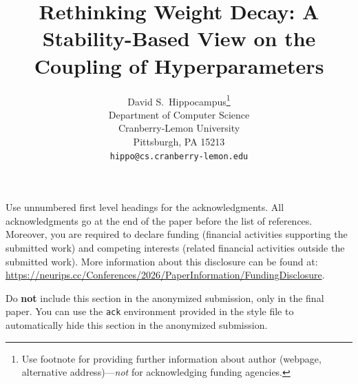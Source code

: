 \documentclass{article}
\title{Rethinking Weight Decay: A Stability-Based View on the Coupling of Hyperparameters}
\author{%
  David S.~Hippocampus\thanks{Use footnote for providing further information
    about author (webpage, alternative address)---\emph{not} for acknowledging
    funding agencies.} \\
  Department of Computer Science\\
  Cranberry-Lemon University\\
  Pittsburgh, PA 15213 \\
  \texttt{hippo@cs.cranberry-lemon.edu} \\
}
\begin{document}
\maketitle




















\begin{ack}
Use unnumbered first level headings for the acknowledgments. All acknowledgments
go at the end of the paper before the list of references. Moreover, you are required to declare
funding (financial activities supporting the submitted work) and competing interests (related financial activities outside the submitted work).
More information about this disclosure can be found at: \url{https://neurips.cc/Conferences/2026/PaperInformation/FundingDisclosure}.


Do {\bf not} include this section in the anonymized submission, only in the final paper. You can use the \texttt{ack} environment provided in the style file to automatically hide this section in the anonymized submission.
\end{ack}




\newpage
\appendix




\newpage

\end{document}
